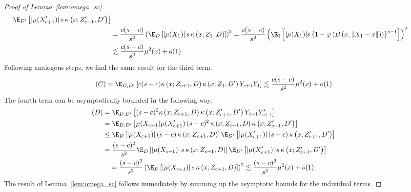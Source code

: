 \begin{proof}[Proof of Lemma~\ref{lem:omega_sc}]
\begin{equation}
\begin{aligned}
			\E_{D^{\prime}}\left[|\mu(X_{c+1}^{\prime})| \, s \, \kappa\left(x; Z_{c+1}^{\prime}, D^{\prime}\right)\right]                                                                                   \\
			 & = \frac{c (s-c)}{s^2} \left(\E_{D}\left[|\mu(X_1)| \, s \, \kappa\left(x; Z_{1}, D\right)\right]\right)^2                                                                       
			= \frac{c (s-c)}{s^2} \left(\E_{1}\left[|\mu(X_1)| s\left\{1 - \varphi\left(B\left(x, \|X_1 - x\|\right)\right)\right\}^{s-1}\right]\right)^2                          \\
			 & \lesssim \frac{c(s-c)}{s^2}\mu^2(x) + o(1)
		\end{aligned}
	\end{equation}
	Following analogous steps, we find the same result for the third term.
	\begin{equation}
		\begin{aligned}
			(C)
            = \E_{D, D^{\prime}}\left[c(s-c) \kappa\left(x; Z_{c+1}, D\right)\kappa\left(x; Z_{1}, D^{\prime}\right)Y_{c+1}Y_{1}\right]
			\lesssim \frac{c(s-c)}{s^2}\mu^2(x) + o(1)
		\end{aligned}
	\end{equation}
	The fourth term can be asymptotically bounded in the following way.
	\begin{equation}
		\begin{aligned}
			(D)
            & = \E_{D, D^{\prime}}\left[(s-c)^2 \kappa\left(x; Z_{c+1}, D\right)\kappa\left(x; Z_{c+1}^{\prime}, D^{\prime}\right)Y_{c+1}Y_{c+1}^{\prime}\right]                                           \\
			 & = \E_{D, D^{\prime}}\left[\mu(X_{c+1})\mu(X_{c+1}^{\prime})\, (s-c)^2 \, \kappa\left(x; Z_{c+1}, D\right)\kappa\left(x; Z_{c+1}^{\prime}, D^{\prime}\right)\right] \\
			 & \leq \E_{D}\left[|\mu(X_{c+1})|\, (s-c) \, \kappa\left(x; Z_{c+1}, D\right)\right]
			\E_{D^{\prime}}\left[|\mu(X_{c+1}^{\prime})|\, (s-c) \, \kappa\left(x; Z_{c+1}^{\prime}, D^{\prime}\right)\right]                                                                                      \\
			 & = \frac{(s-c)^2}{s^2} \E_{D}\left[|\mu(X_{c+1})|\, s \, \kappa\left(x; Z_{c+1}, D\right)\right]
			\E_{D^{\prime}}\left[|\mu(X_{c+1}^{\prime})|\, s \, \kappa\left(x; Z_{c+1}^{\prime}, D^{\prime}\right)\right]                                                                                          \\
			 & \quad = \frac{(s-c)^2}{s^2} \left(\E_{D}\left[|\mu(X_{c+1})|\, s \, \kappa\left(x; Z_{c+1}, D\right)\right]\right)^2                                                                        
			\lesssim \frac{(s-c)^2}{s^2}\mu^2(x) + o(1)
		\end{aligned}
	\end{equation}
	The result of Lemma~\ref{lem:omega_sc} follows immediately by summing up the asymptotic bounds for the individual terms.
\end{proof}

